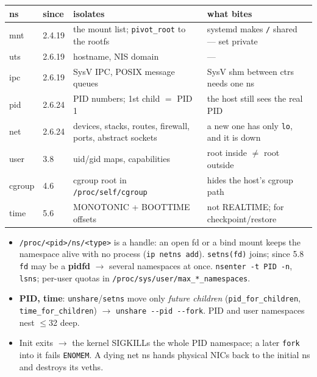 \documentclass[8pt]{extarticle}
\newcommand\ct[1]{\texttt{#1}}
\newcommand\dd{\hbox{-}\hbox{-}}
\newcommand\hd[1]{\par\vspace{2pt}\noindent{\small\bfseries\color{sheetBlue}#1}\par\vspace{1pt}}
\begin{document}

\begin{multicols}{2}
\raggedright
\footnotesize{}

\hd{The 8 namespaces}
{\scriptsize\setlength\tabcolsep{2pt}
\begin{tabular}{@{}>{\ttfamily}L{7.5mm}L{7.5mm}L{30mm}L{31mm}@{}}
\toprule
\textrm{\textbf{ns}} & \textbf{since} & \textbf{isolates} & \textbf{what bites}\\
\midrule
mnt & 2.4.19 & the mount list; \ct{pivot\_root} to the rootfs & systemd makes \ct{/} shared — set private\\
uts & 2.6.19 & hostname, NIS domain & —\\
ipc & 2.6.19 & SysV IPC, POSIX message queues & SysV shm between ctrs needs one ns\\
pid & 2.6.24 & PID numbers; 1st child $=$ PID 1 & the host still sees the real PID\\
net & 2.6.24 & devices, stacks, routes, firewall, ports, abstract sockets & a new one has only \ct{lo}, and it is down\\
user & 3.8 & uid/gid maps, capabilities & root inside $\neq$ root outside\\
cgroup & 4.6 & cgroup root in \ct{/proc/self/cgroup} & hides the host's cgroup path\\
time & 5.6 & MONOTONIC + BOOTTIME offsets & not REALTIME; for checkpoint/restore\\
\bottomrule
\end{tabular}}
\begin{itemize}
  \item \ct{/proc/<pid>/ns/<type>} is a handle: an open fd or a bind mount keeps the namespace
        alive with no process (\ct{ip netns add}). \ct{setns(fd)} joins; since 5.8 \ct{fd} may be
        a \textbf{pidfd} $\to$ several namespaces at once. \ct{nsenter -t PID -n}, \ct{lsns};
        per-user quotas in \ct{/proc/sys/user/max\_*\_namespaces}.
  \item \textbf{PID, time}: \ct{unshare}/\ct{setns} move only \emph{future children}
        (\ct{pid\_for\_children}, \ct{time\_for\_children}) $\to$ \ct{unshare \dd pid \dd fork}.
        PID and user namespaces nest $\le$32 deep.
  \item Init exits $\to$ the kernel SIGKILLs the whole PID namespace; a later \ct{fork} into it
        fails \ct{ENOMEM}. A dying net ns hands physical NICs back to the initial ns and destroys
        its veths.
\end{itemize}


\end{multicols}
\end{document}
